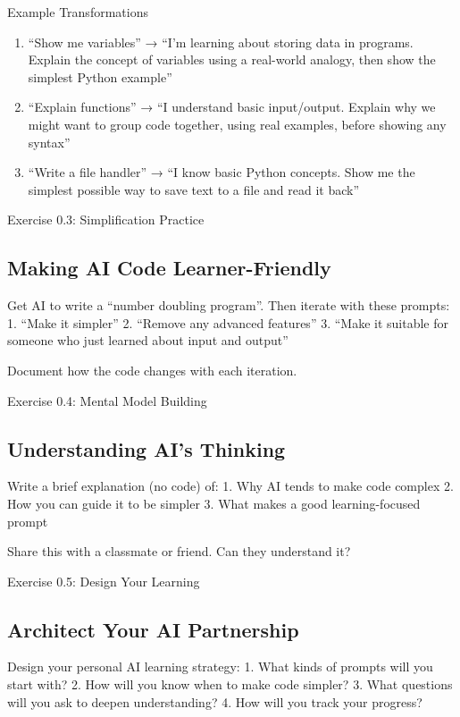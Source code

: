 \documentclass[
  letterpaper,
  DIV=11,
  numbers=noendperiod,
  oneside]{scrreprt}
\begin{document}
Example Transformations

\begin{enumerate}
\def\labelenumi{\arabic{enumi}.}
\item
  ``Show me variables'' → ``I'm learning about storing data in programs.
  Explain the concept of variables using a real-world analogy, then show
  the simplest Python example''
\item
  ``Explain functions'' → ``I understand basic input/output. Explain why
  we might want to group code together, using real examples, before
  showing any syntax''
\item
  ``Write a file handler'' → ``I know basic Python concepts. Show me the
  simplest possible way to save text to a file and read it back''
\end{enumerate}

Exercise 0.3: Simplification Practice

\subsection{Making AI Code
Learner-Friendly}\label{making-ai-code-learner-friendly}

Get AI to write a ``number doubling program''. Then iterate with these
prompts: 1. ``Make it simpler'' 2. ``Remove any advanced features'' 3.
``Make it suitable for someone who just learned about input and output''

Document how the code changes with each iteration.

Exercise 0.4: Mental Model Building

\subsection{Understanding AI's
Thinking}\label{understanding-ais-thinking}

Write a brief explanation (no code) of: 1. Why AI tends to make code
complex 2. How you can guide it to be simpler 3. What makes a good
learning-focused prompt

Share this with a classmate or friend. Can they understand it?

Exercise 0.5: Design Your Learning

\subsection{Architect Your AI
Partnership}\label{architect-your-ai-partnership}

Design your personal AI learning strategy: 1. What kinds of prompts will
you start with? 2. How will you know when to make code simpler? 3. What
questions will you ask to deepen understanding? 4. How will you track
your progress?
\end{document}
